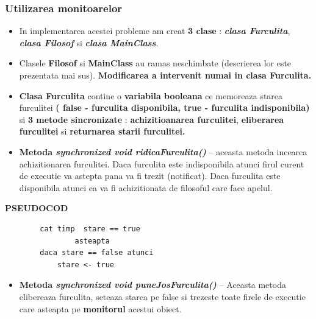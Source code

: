 \documentclass[14pt]{article}
\begin{document}
\subsubsection{\textbf{Utilizarea monitoarelor}}

\begin{itemize}
\item In implementarea acestei probleme am creat \textbf{3 clase} :\textbf{\textit{ clasa Furculita}}, \textbf{\textit{clasa Filosof}} si \textbf{\textit{clasa MainClass}}.
\end{itemize}


\begin{itemize}
\item Clasele \textbf{Filosof} si \textbf{MainClass} au ramas neschimbate (descrierea lor este prezentata mai sus).\textbf{ Modificarea a intervenit numai in clasa Furculita.}
\end{itemize}

\begin{itemize}
\item \textbf{Clasa Furculita} contine o \textbf{variabila booleana} ce memoreaza starea furculitei\textbf{ ( false - furculita disponibila, true - furculita indisponibila)} si \textbf{3 metode sincronizate} : \textbf{achizitioanarea furculitei}, \textbf{eliberarea furculitei }si\textbf{ returnarea starii furculitei.}
\end{itemize}


\begin{itemize}
\item \textbf{Metoda\textit{ synchronized void ridicaFurculita()}} -- aceasta metoda incearca achizitionarea furculitei. Daca furculita este indisponibila atunci firul curent de executie va astepta pana va fi trezit (notificat). Daca furculita este disponibila atunci ea va fi achizitionata de filosoful care face apelul.
\end{itemize}


 \textbf{PSEUDOCOD}
 \begin{lstlisting}
		cat timp  stare == true
				asteapta
		daca stare == false atunci	
			stare <- true
\end{lstlisting}

\begin{itemize}
\item \textbf{Metoda\textit{ synchronized void puneJosFurculita()}} -- Aceasta metoda elibereaza furculita, seteaza starea pe false si trezeste toate firele de executie care asteapta pe \textbf{monitorul} acestui obiect.
\end{itemize}
\end{document}
